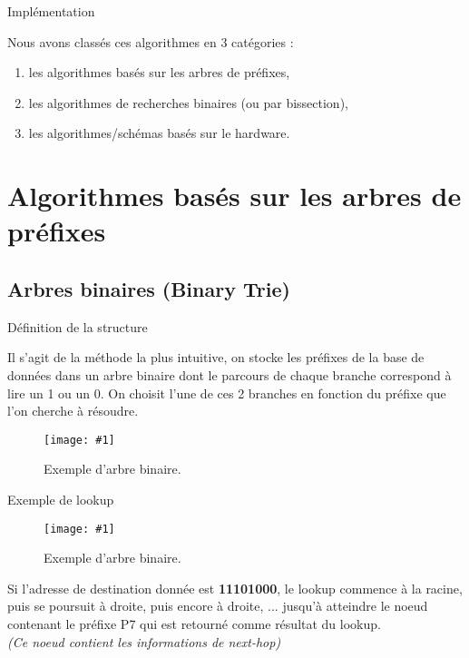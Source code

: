 \documentclass{beamer}
\newcommand{\imageR}[2]{\texttt{[image: \#1]}}
\newcommand{\cerm}[1]{\textcolor{maintitle}{#1}}
\begin{document}
\begin{frame}{Implémentation}

Nous avons classés ces algorithmes en 3 catégories :
\begin{enumerate}
\pause \item les algorithmes basés sur les arbres de préfixes,
\item les algorithmes de recherches binaires (ou par bissection),
\item les algorithmes/schémas basés sur le hardware.
\end{enumerate}

\end{frame}


\section{Algorithmes basés sur les arbres de préfixes}


\subsection{Arbres binaires (Binary Trie)}

\begin{frame}{Définition de la structure}

Il s'agit de la méthode la plus intuitive, on stocke les préfixes de la base de données dans un arbre binaire dont le parcours de 
chaque branche correspond à lire un 1 ou un 0. On choisit l'une de ces 2 branches en fonction du préfixe que l'on cherche à
résoudre.

\begin{figure}
	\begin{center}
	\imageR{CN_002.png}{100}
	\caption{Exemple d'arbre binaire.}
	\end{center}	
\end{figure}

\end{frame}

\begin{frame}{Exemple de lookup}

\begin{figure}
	\begin{center}
	\imageR{CN_003.png}{100}
	\caption{Exemple d'arbre binaire.}
	\end{center}	
\end{figure}

Si l'adresse de destination donnée est \textbf{11101000}, le \cerm{lookup} commence à la racine, puis se poursuit à 
droite, puis encore à droite, ... jusqu'à atteindre le noeud contenant le préfixe P7 qui est retourné comme résultat du lookup.\\
\textit{(Ce noeud contient les informations de next-hop)}
\end{frame}
\end{document}

